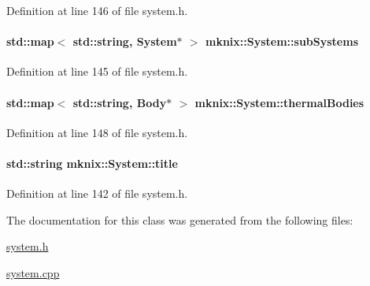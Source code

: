 Definition at line 146 of file system.\+h.

\hypertarget{classmknix_1_1_system_a90dd5d1e76958c720a2bad6e9bd4ceb2}{}
\paragraph[{sub\+Systems}]{\setlength{\rightskip}{0pt plus 5cm}std\+::map$<$ std\+::string, {\bf System}$\ast$ $>$ mknix\+::\+System\+::sub\+Systems\hspace{0.3cm}{\ttfamily [protected]}}\label{classmknix_1_1_system_a90dd5d1e76958c720a2bad6e9bd4ceb2}


Definition at line 145 of file system.\+h.

\hypertarget{classmknix_1_1_system_a5f3e180ba138e01570ffe8aba62a1df7}{}
\paragraph[{thermal\+Bodies}]{\setlength{\rightskip}{0pt plus 5cm}std\+::map$<$ std\+::string, {\bf Body}$\ast$ $>$ mknix\+::\+System\+::thermal\+Bodies\hspace{0.3cm}{\ttfamily [protected]}}\label{classmknix_1_1_system_a5f3e180ba138e01570ffe8aba62a1df7}


Definition at line 148 of file system.\+h.

\hypertarget{classmknix_1_1_system_a2dcd01381b3eec7b2e8e2c1c3ab38972}{}
\paragraph[{title}]{\setlength{\rightskip}{0pt plus 5cm}std\+::string mknix\+::\+System\+::title\hspace{0.3cm}{\ttfamily [protected]}}\label{classmknix_1_1_system_a2dcd01381b3eec7b2e8e2c1c3ab38972}


Definition at line 142 of file system.\+h.



The documentation for this class was generated from the following files\+:\begin{DoxyCompactItemize}
\item 
\hyperlink{system_8h}{system.\+h}\item 
\hyperlink{system_8cpp}{system.\+cpp}\end{DoxyCompactItemize}

